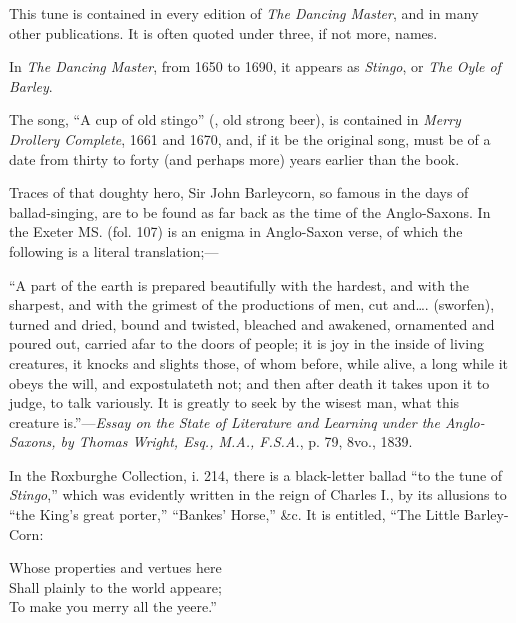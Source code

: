 

This tune is contained in every edition of \textit{The Dancing Master}, and in many
other publications. It is often quoted under three, if not more, names.

In \textit{The Dancing Master}, from 1650 to 1690, it appears as \textit{Stingo}, or \textit{The Oyle
of Barley}.

The song, “A cup of old stingo” (\ie, old strong beer), is contained in \textit{Merry
Drollery Complete}, 1661 and 1670, and, if it be the original song, must be of a
date from thirty to forty (and perhaps more) years earlier than the book.

Traces of that doughty hero, Sir John Barleycorn, so famous in the days of
ballad-singing, are to be found as far back as the time of the Anglo-Saxons. In
the Exeter MS. (fol. 107) is an enigma in Anglo-Saxon verse, of which the
following is a literal translation;—

{\footnotesizerr “A part of the earth is prepared beautifully with the hardest, and with the sharpest,
and with the grimest of the productions of men, cut and\ldots . (sworfen), turned and
dried, bound and twisted, bleached and awakened, ornamented and poured out, carried
afar to the doors of people; it is joy in the inside of living creatures, it knocks and
slights those, of whom before, while alive, a long while it obeys the will, and expostulateth
not; and then after death it takes upon it to judge, to talk variously. It is
greatly to seek by the wisest man, what this creature is.”—\textit{Essay on the State of
Literature and Learninq under the Anglo-Saxons, by Thomas Wright, Esq., M.A.,
F.S.A.}, p. 79, 8vo., 1839.}

In the Roxburghe Collection, i. 214, there is a black-letter ballad “to the tune
of \textit{Stingo},” which was evidently written in the reign of Charles I., by its
allusions to “the King’s great porter,” “Bankes’ Horse,” \&c. It is entitled,
“The Little Barley-Corn:
\settowidth{\versewidth}{Whose properties and vertues here}
\begin{scverse}Whose properties and vertues here\\
Shall plainly to the world appeare;\\
To make you merry all the yeere.”
\end{scverse}

